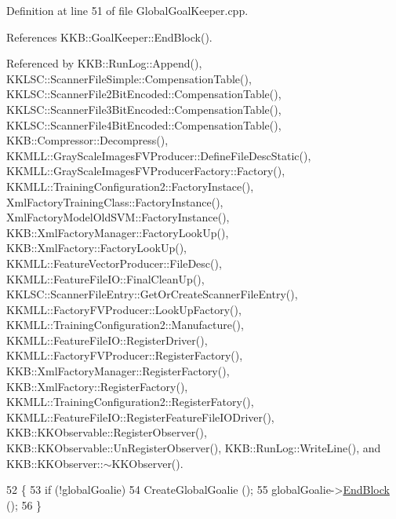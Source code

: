Definition at line 51 of file Global\+Goal\+Keeper.\+cpp.



References K\+K\+B\+::\+Goal\+Keeper\+::\+End\+Block().



Referenced by K\+K\+B\+::\+Run\+Log\+::\+Append(), K\+K\+L\+S\+C\+::\+Scanner\+File\+Simple\+::\+Compensation\+Table(), K\+K\+L\+S\+C\+::\+Scanner\+File2\+Bit\+Encoded\+::\+Compensation\+Table(), K\+K\+L\+S\+C\+::\+Scanner\+File3\+Bit\+Encoded\+::\+Compensation\+Table(), K\+K\+L\+S\+C\+::\+Scanner\+File4\+Bit\+Encoded\+::\+Compensation\+Table(), K\+K\+B\+::\+Compressor\+::\+Decompress(), K\+K\+M\+L\+L\+::\+Gray\+Scale\+Images\+F\+V\+Producer\+::\+Define\+File\+Desc\+Static(), K\+K\+M\+L\+L\+::\+Gray\+Scale\+Images\+F\+V\+Producer\+Factory\+::\+Factory(), K\+K\+M\+L\+L\+::\+Training\+Configuration2\+::\+Factory\+Instace(), Xml\+Factory\+Training\+Class\+::\+Factory\+Instance(), Xml\+Factory\+Model\+Old\+S\+V\+M\+::\+Factory\+Instance(), K\+K\+B\+::\+Xml\+Factory\+Manager\+::\+Factory\+Look\+Up(), K\+K\+B\+::\+Xml\+Factory\+::\+Factory\+Look\+Up(), K\+K\+M\+L\+L\+::\+Feature\+Vector\+Producer\+::\+File\+Desc(), K\+K\+M\+L\+L\+::\+Feature\+File\+I\+O\+::\+Final\+Clean\+Up(), K\+K\+L\+S\+C\+::\+Scanner\+File\+Entry\+::\+Get\+Or\+Create\+Scanner\+File\+Entry(), K\+K\+M\+L\+L\+::\+Factory\+F\+V\+Producer\+::\+Look\+Up\+Factory(), K\+K\+M\+L\+L\+::\+Training\+Configuration2\+::\+Manufacture(), K\+K\+M\+L\+L\+::\+Feature\+File\+I\+O\+::\+Register\+Driver(), K\+K\+M\+L\+L\+::\+Factory\+F\+V\+Producer\+::\+Register\+Factory(), K\+K\+B\+::\+Xml\+Factory\+Manager\+::\+Register\+Factory(), K\+K\+B\+::\+Xml\+Factory\+::\+Register\+Factory(), K\+K\+M\+L\+L\+::\+Training\+Configuration2\+::\+Register\+Fatory(), K\+K\+M\+L\+L\+::\+Feature\+File\+I\+O\+::\+Register\+Feature\+File\+I\+O\+Driver(), K\+K\+B\+::\+K\+K\+Observable\+::\+Register\+Observer(), K\+K\+B\+::\+K\+K\+Observable\+::\+Un\+Register\+Observer(), K\+K\+B\+::\+Run\+Log\+::\+Write\+Line(), and K\+K\+B\+::\+K\+K\+Observer\+::$\sim$\+K\+K\+Observer().


\begin{DoxyCode}
52 \{
53   \textcolor{keywordflow}{if}  (!globalGoalie)
54     CreateGlobalGoalie ();
55   globalGoalie->\hyperlink{class_k_k_b_1_1_goal_keeper_aee88d11d3466dd77ef3e5b18c87e27fb}{EndBlock} ();
56 \}
\end{DoxyCode}

